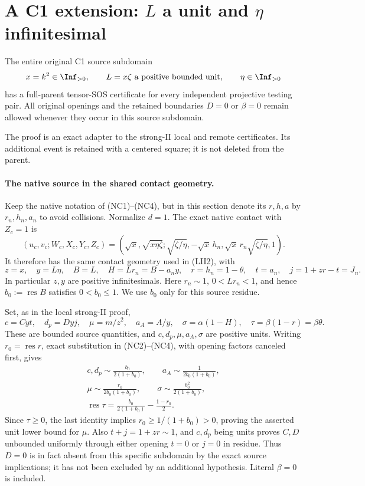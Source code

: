 \section{A C1 extension: $L$ a unit and $\eta$ infinitesimal}
\label{sec:r7-c1-L-unit-eta-small}

\begin{theorem}
The entire original C1 source subdomain
\[
 x=k^2\in\Inf_{>0},\qquad L=x\zeta\text{ a positive bounded unit},
 \qquad \eta\in\Inf_{>0}
\]
has a full-parent tensor-SOS certificate for every independent
projective testing pair.  All original openings and the retained
boundaries $D=0$ or $\beta=0$ remain allowed whenever they occur
in this source subdomain.
\end{theorem}

The proof is an exact adapter to the strong-II local and remote
certificates.  Its additional event is retained with a centered
square; it is not deleted from the parent.

\paragraph{The native source in the shared contact geometry.}
Keep the native notation of (NC1)--(NC4), but in this section denote
its $r,h,a$ by $r_n,h_n,a_n$ to avoid collisions.  Normalize $d=1$.
The exact native contact with $Z_c=1$ is
\[
 (u_c,v_c;W_c,X_c,Y_c,Z_c)
 =\left(\sqrt x,\sqrt{x\eta\zeta};
 \sqrt{\zeta/\eta},-\sqrt x\,h_n,
 \sqrt x\,r_n\sqrt{\zeta/\eta},1\right).
\]
It therefore has the same contact geometry used in (LII2), with
\[
 z=x,\quad y=L\eta,\quad B=L,\quad H=Lr_n=B-a_ny,
 \quad r=h_n=1-\theta,\quad t=a_n,\quad
 j=1+zr-t=J_n.                                           \tag{LC1}
\]
In particular $z,y$ are positive infinitesimals.  Here $r_n\sim1$,
$0<Lr_n<1$, and hence $b_0:=\operatorname{res}B$ satisfies
$0<b_0\le1$.  We use $b_0$ only for this source residue.

Set, as in the local strong-II proof,
\[
 c=Cyt,\quad d_p=Dyj,\quad
 \mu=m/z^2,\quad a_A=A/y,\quad
 \sigma=\alpha(1-H),\quad \tau=\beta(1-r)=\beta\theta.
\]
These are bounded source quantities, and $c,d_p,\mu,a_A,\sigma$
are positive units.  Writing $r_0=\operatorname{res}r$, exact
substitution in (NC2)--(NC4), with opening factors canceled first,
gives
\[
\begin{gathered}
 c,d_p\sim\frac{b_0}{2(1+b_0)},\qquad
 a_A\sim\frac1{2b_0(1+b_0)},\\
 \mu\sim\frac{r_0}{2b_0(1+b_0)},\qquad
 \sigma\sim\frac{b_0^2}{2(1+b_0)},\\
 \operatorname{res}\tau=
 \frac{b_0}{2(1+b_0)}-\frac{1-r_0}{2}.                    \tag{LC2}
\end{gathered}
\]
Since $\tau\ge0$, the last identity implies
$r_0\ge1/(1+b_0)>0$, proving the asserted unit lower bound for
$\mu$.  Also $t+j=1+zr\sim1$, and $c,d_p$ being units proves
$C,D$ unbounded uniformly through either opening $t=0$ or $j=0$
in residue.  Thus $D=0$ is in fact absent from this specific
subdomain by the exact source implications; it has not been excluded
by an additional hypothesis.  Literal $\beta=0$ is included.

